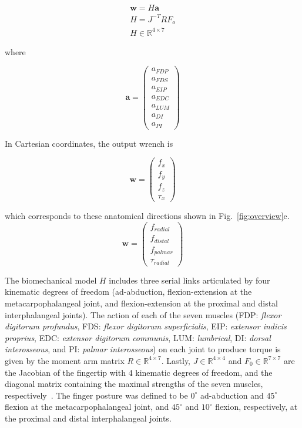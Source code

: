 \documentclass[letterpaper]{article}
\begin{document}
\begin{eqnarray}
\textbf{w} = H \textbf{a} \\
H=J^{-T}RF_o \\
H \in \mathbb{R}^{4 \times 7}
\end{eqnarray}

where

\begin{equation}
\label{eq:a}
\textbf{a}=
\begin{pmatrix}
a_{FDP}\\
a_{FDS}\\
a_{EIP}\\
a_{EDC}\\
a_{LUM}\\
a_{DI}\\
a_{PI}
\end{pmatrix}
\end{equation}

In Cartesian coordinates, the output wrench is

\begin{equation}
\label{eq:wc}
\textbf{w}=
\begin{pmatrix}
f_{x}\\
f_{y}\\
f_{z}\\
\tau_{x}
\end{pmatrix}
\end{equation}

which corresponds to these anatomical directions shown in Fig.~\ref{fig:overview}e.
\begin{equation}
\label{eq:wa}
\textbf{w}=
\begin{pmatrix}
f_{radial}\\
f_{distal}\\
f_{palmar}\\
\tau_{radial}
\end{pmatrix}
\end{equation}

The biomechanical model $H$ includes three serial links articulated by four kinematic degrees of freedom (ad-abduction, flexion-extension at the metacarpophalangeal joint, and flexion-extension at the proximal and distal interphalangeal joints). The action of each of the seven muscles (FDP: \emph{flexor digitorum profundus}, FDS: \emph{flexor digitorum superficialis}, EIP: \emph{extensor indicis proprius}, EDC: \emph{extensor digitorum communis}, LUM: \emph{lumbrical}, DI: \emph{dorsal interosseous}, and PI: \emph{palmar interosseous}) on each joint to produce torque is given by the moment arm matrix $R \in \mathbb{R}^{4 \times 7}$. Lastly, $J \in \mathbb{R}^{4 \times 4}$ and $F_0 \in \mathbb{R}^{7 \times 7}$ are the Jacobian of the fingertip with 4 kinematic degrees of freedom, and the diagonal matrix containing the maximal strengths of the seven muscles, respectively~\cite{valero-cuevas2015fundamentals,Valero-Cuevas2000Scaling}. The finger posture was defined to be $0^\circ$ ad-abduction and $45^\circ$ flexion at the metacarpophalangeal joint, and $45^\circ$ and $10^\circ$ flexion, respectively, at the proximal and distal interphalangeal joints.
\end{document}
